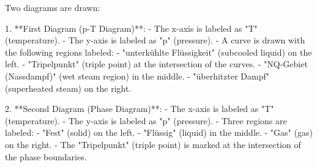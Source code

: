 Two diagrams are drawn:  

1. **First Diagram (p-T Diagram)**:  
   - The x-axis is labeled as "T" (temperature).  
   - The y-axis is labeled as "p" (pressure).  
   - A curve is drawn with the following regions labeled:  
     - "unterkühlte Flüssigkeit" (subcooled liquid) on the left.  
     - "Tripelpunkt" (triple point) at the intersection of the curves.  
     - "NQ-Gebiet (Nassdampf)" (wet steam region) in the middle.  
     - "überhitzter Dampf" (superheated steam) on the right.  

2. **Second Diagram (Phase Diagram)**:  
   - The x-axis is labeled as "T" (temperature).  
   - The y-axis is labeled as "p" (pressure).  
   - Three regions are labeled:  
     - "Fest" (solid) on the left.  
     - "Flüssig" (liquid) in the middle.  
     - "Gas" (gas) on the right.  
   - The "Tripelpunkt" (triple point) is marked at the intersection of the phase boundaries.